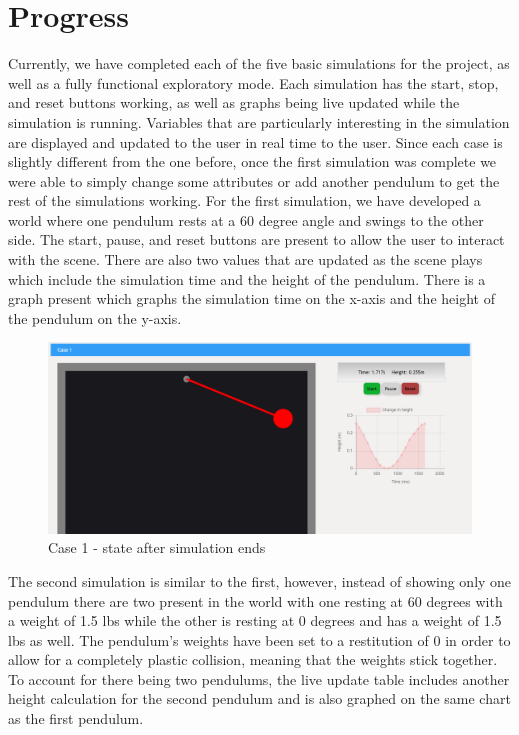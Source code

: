 \documentclass[onecolumn, draftclsnofoot,10pt, compsoc]{IEEEtran}
\begin{document}
\section{Progress}
Currently, we have completed each of the five basic simulations for the project, as well as a fully functional exploratory mode. Each simulation has the start, stop, and reset buttons working, as well as graphs being live updated while the simulation is running. Variables that are particularly interesting in the simulation are displayed and updated to the user in real time to the user. Since each case is slightly different from the one before, once the first simulation was complete we were able to simply change some attributes or add another pendulum to get the rest of the simulations working. \newline
\noindent 
For the first simulation, we have developed a world where one pendulum rests at a 60 degree angle and swings to the other side. The start, pause, and reset buttons are present to allow the user to interact with the scene. There are also two values that are updated as the scene plays which include the simulation time and the height of the pendulum. There is a graph present which graphs the simulation time on the x-axis and the height of the pendulum on the y-axis. 

\begin{figure}[H]
  \includegraphics[width=5.5 in]{pictures_beta/case1_end.png}
  \caption{Case 1 - state after simulation ends }
  \label{fig:case1_end}
\end{figure}

\noindent 
The second simulation is similar to the first, however, instead of showing only one pendulum there are two present in the world with one resting at 60 degrees with a weight of 1.5 lbs while the other is resting at 0 degrees and has a weight of 1.5 lbs as well. The pendulum's weights have been set to a restitution of 0 in order to allow for a completely plastic collision, meaning that the weights stick together. To account for there being two pendulums, the live update table includes another height calculation for the second pendulum and is also graphed on the same chart as the first pendulum.
\end{document}

